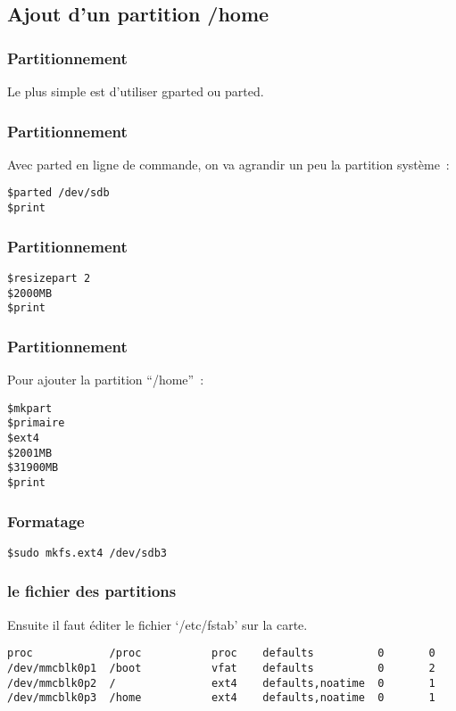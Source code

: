 \subsection{Ajout d'un partition /home}

\begin{frame}[containsverbatim]
\frametitle{Partitionnement}

Le plus simple est d'utiliser gparted ou parted.

\end{frame}

\begin{frame}[containsverbatim]
\frametitle{Partitionnement}

Avec parted en ligne de commande, on va agrandir un peu la partition système~:
\begin{verbatim}
$parted /dev/sdb
$print
\end{verbatim}
\end{frame}


\begin{frame}[containsverbatim]
\frametitle{Partitionnement}
\begin{verbatim}
$resizepart 2
$2000MB
$print
\end{verbatim}

\end{frame}

\begin{frame}[containsverbatim]
\frametitle{Partitionnement}

Pour ajouter la partition ``/home''~:

\begin{verbatim}
$mkpart
$primaire
$ext4
$2001MB
$31900MB
$print
\end{verbatim}

\end{frame}

\begin{frame}[containsverbatim]
\frametitle{Formatage}

\begin{verbatim}
$sudo mkfs.ext4 /dev/sdb3

\end{verbatim}
\end{frame}

\begin{frame}[containsverbatim]
\frametitle{le fichier des partitions}

Ensuite il faut éditer le fichier `/etc/fstab' sur la carte.

\begin{verbatim}
proc            /proc           proc    defaults          0       0
/dev/mmcblk0p1  /boot           vfat    defaults          0       2
/dev/mmcblk0p2  /               ext4    defaults,noatime  0       1
/dev/mmcblk0p3  /home           ext4    defaults,noatime  0       1
\end{verbatim}
\end{frame}

